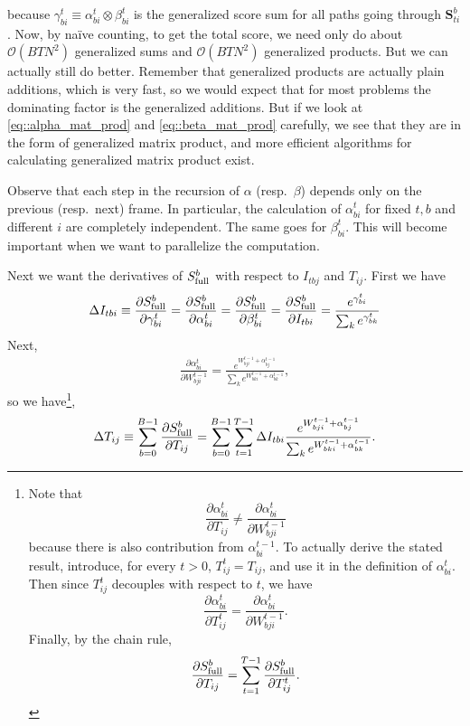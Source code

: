 \documentclass[a4paper]{article}
\begin{document}
because $\gamma^t_{bi}\equiv\alpha^t_{bi}\otimes \beta^t_{bi}$ is the generalized score sum for all paths going through $\mathbf{S}^b_{ti}$. Now, by na\"ive counting, to get the total score, we need only do about $\mathcal{O}(BTN^2)$ generalized sums and $\mathcal{O}(BTN^2)$ generalized products. But we can actually still do better. Remember that generalized products are actually plain additions, which is very fast, so we would expect that for most problems the dominating factor is the generalized additions. But if we look at \eqref{eq::alpha_mat_prod} and \eqref{eq::beta_mat_prod} carefully, we see that they are in the form of generalized matrix product, and more efficient algorithms for calculating generalized matrix product exist.

Observe that each step in the recursion of $\alpha$ (resp.~$\beta$) depends only on the previous (resp.~next) frame. In particular, the calculation of $\alpha^t_{bi}$ for fixed $t, b$ and different $i$ are completely independent. The same goes for $\beta^{t}_{bi}$. This will become important when we want to parallelize the computation.

Next we want the derivatives of $S_{\rm{full}}^b$ with respect to $I_{tbj}$ and $T_{ij}$. First we have
\begin{equation}
\Delta I_{tbi} \equiv \frac{\partial S^b_{\rm{full}}}{\partial\gamma^t_{bi}}=\frac{\partial S^b_{\rm{full}}}{\partial\alpha^t_{bi}}=\frac{\partial S^b_{\rm{full}}}{\partial\beta^t_{bi}}=\frac{\partial S^b_{\rm{full}}}{\partial I_{tbi}}=\frac{e^{\gamma^t_{bi}}}{\sum_k e^{\gamma^t_{bk}}}
\end{equation}
Next,
\begin{align}
\frac{\partial\alpha^t_{bi}}{\partial W^{t-1}_{bji}}=\frac{e^{W^{t-1}_{bji}+\alpha^{t-1}_{bj}}}{\sum_k e^{W^{t-1}_{bki}+\alpha^{t-1}_{bk}}},
\end{align}
so we have\footnote{
Note that 
\begin{equation}
\frac{\partial\alpha^t_{bi}}{\partial T_{ij}}\neq\frac{\partial\alpha^t_{bi}}{\partial W^{t-1}_{bji}}
\end{equation}
because there is also contribution from $\alpha^{t-1}_{bi}$. To actually derive the stated result, introduce, for every $t>0$, $T^t_{ij}=T_{ij}$, and use it in the definition of $\alpha^t_{bi}$. Then since $T^t_{ij}$ decouples with respect to $t$, we have
\begin{equation}
\frac{\partial\alpha^t_{bi}}{\partial T^{t}_{ij}}=\frac{\partial\alpha^t_{bi}}{\partial W^{t-1}_{bji}}.
\end{equation}
Finally, by the chain rule,
\begin{equation}
\frac{\partial S^b_{\rm{full}}}{\partial T_{ij}}=\sum_{t=1}^{T-1}\frac{\partial S^b_{\rm{full}}}{\partial T^t_{ij}}.
\end{equation}
},
\begin{equation}
\Delta T_{ij} 
\equiv \sum_{b=0}^{B-1}\frac{\partial S^b_{\rm{full}}}{\partial T_{ij}} 
= \sum_{b=0}^{B-1}\sum_{t=1}^{T-1} \Delta I_{tbi}\frac{e^{W^{t-1}_{bji}+\alpha^{t-1}_{bj}}}{\sum_k e^{W^{t-1}_{bki}+\alpha^{t-1}_{bk}}}.
\end{equation}
\end{document}
